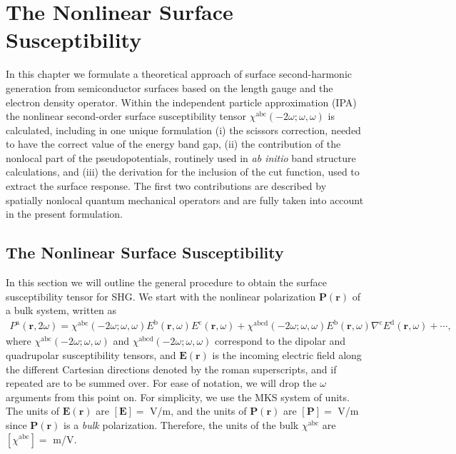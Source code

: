 \chapter{The Nonlinear Surface Susceptibility}\label{chap:chi2}
\partialtoc


In this chapter we formulate a theoretical approach of surface second-harmonic
generation from semiconductor surfaces based on the length gauge and the
electron density operator. Within the independent particle approximation (IPA)
the nonlinear second-order surface susceptibility tensor
$\chi^{\mathrm{a}\mathrm{b}\mathrm{c}}(-2\omega;\omega,\omega)$ is calculated,
including in one unique formulation (i) the scissors correction, needed to have
the correct value of the energy band gap, (ii) the contribution of the nonlocal
part of the pseudopotentials, routinely  used in \textit{ab initio} band
structure calculations, and (iii) the derivation for the inclusion of the cut
function, used to extract the surface response. The first two contributions are
described by spatially nonlocal quantum mechanical operators and are fully taken
into account in the present formulation.



\section{The Nonlinear Surface Susceptibility}

In this section we will outline the general procedure to obtain the surface
susceptibility tensor for SHG. We start with the nonlinear polarization
$\mathbf{P}(\mathbf{r})$ of a bulk system, written as
\begin{equation}\label{mshg}
\begin{split}
P^{\mathrm{a}}(\mathbf{r},2\omega)
= \chi^{\mathrm{abc}}(-2\omega;\omega,\omega)
  E^{\mathrm{b}}(\mathbf{r},\omega)E^{\mathrm{c}}(\mathbf{r},\omega)
+ \chi^{\mathrm{abcd}}(-2\omega;\omega,\omega)
  E^{\mathrm{b}}(\mathbf{r},\omega)\nabla^{\mathrm{c}}
  E^{\mathrm{d}}(\mathbf{r},\omega)
+ \cdots,
\end{split}
\end{equation}
where $\chi^{\mathrm{abc}}(-2\omega;\omega,\omega)$ and
$\chi^{\mathrm{abcd}}(-2\omega;\omega,\omega)$ correspond to the dipolar and
quadrupolar susceptibility tensors, and $\mathbf{E}(\mathbf{r})$ is the incoming
electric field along the different Cartesian directions denoted by the roman
superscripts, and if repeated are to be summed over. For ease of notation, we
will drop the $\omega$ arguments from this point on. For simplicity, we use the
MKS system of units. The units of $\mathbf{E}(\mathbf{r})$ are $[\mathbf{E}] = $
V/m, and the units of $\mathbf{P}(\mathbf{r})$ are $[\mathbf{P}] = $ V/m since
$\mathbf{P}(\mathbf{r})$ is a \emph{bulk} polarization. Therefore, the units of
the bulk $\chi^{\mathrm{abc}}$ are $[\chi^{\mathrm{abc}}] = $ m/V.

